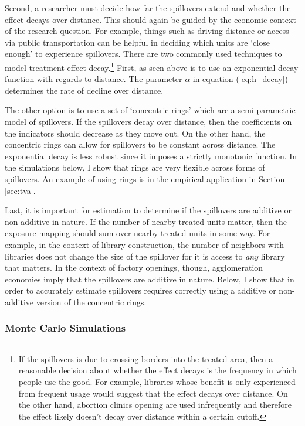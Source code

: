 \documentclass[11pt]{article}
\begin{document}
Second, a researcher must decide how far the spillovers extend and whether the effect decays over distance. This should again be guided by the economic context of the research question. For example, things such as driving distance or access via public transportation can be helpful in deciding which units are `close enough' to experience spillovers. There are two commonly used techniques to model treatment effect decay.\footnote{If the spillovers is due to crossing borders into the treated area, then a reasonable decision about whether the effect decays is the frequency in which people use the good. For example, libraries whose benefit is only experienced from frequent usage would suggest that the effect decays over distance. On the other hand, abortion clinics opening are used infrequently and therefore the effect likely doesn't decay over distance within a certain cutoff.} First, as seen above is to use an exponential decay function with regards to distance. The parameter $\alpha$ in equation (\ref{eq:h_decay}) determines the rate of decline over distance. 

The other option is to use a set of `concentric rings' which are a semi-parametric model of spillovers. If the spillovers decay over distance, then the coefficients on the indicators should decrease as they move out. On the other hand, the concentric rings can allow for spillovers to be constant across distance. The exponential decay is less robust since it imposes a strictly monotonic function. In the simulations below, I show that rings are very flexible across forms of spillovers. An example of using rings is in the empirical application in Section \ref{sec:tva}. 

Last, it is important for estimation to determine if the spillovers are additive or non-additive in nature. If the number of nearby treated units matter, then the exposure mapping should sum over nearby treated units in some way. For example, in the context of library construction, the number of neighbors with libraries does not change the size of the spillover for it is access to \textit{any} library that matters. In the context of factory openings, though, agglomeration economies imply that the spillovers are additive in nature. Below, I show that in order to accurately estimate spillovers requires correctly using a additive or non-additive version of the concentric rings. 

\subsubsection{Monte Carlo Simulations}
\end{document}
